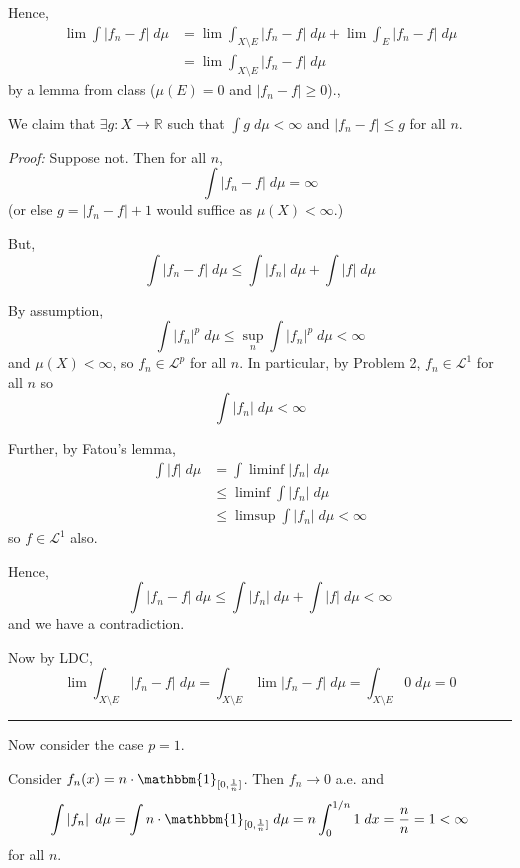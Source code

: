 \documentclass[12pt]{article}
\newcommand{\R}{\mathbb{R}}
\newcommand{\ind}{\mathbbm{1}}
\newcommand{\abs}[1]{\left\vert #1 \right\vert}
\renewcommand{\L}{\mathcal{L}}
\renewcommand{\div}{\vspace*{10pt}\hrule\vspace*{10pt}}
\newenvironment*{proof}[1][blue]{
\begin{tcolorbox}[
    parbox=false,
    colback=#1!5!white,
    colframe=#1!75!black,
    breakable
]}
{\end{tcolorbox}}
\begin{document}
\begin{itemize}
        Hence, 
        \begin{align*}
            \lim \int \abs{f_n - f} \; d\mu &= \lim \int_{X \setminus E} \abs{f_n - f} \; d\mu + \lim \int_E \abs{f_n - f} \; d\mu\\ 
            &= \lim \int_{X \setminus E} \abs{f_n - f} \; d\mu
        \end{align*}
        by a lemma from class ($\mu(E) = 0$ and $\abs{f_n - f} \geq 0$).,

        We claim that $\exists g: X \to \R$ such that $\int g \; d\mu < \infty$ and $\abs{f_n - f} \leq g$ for all $n$.

        \begin{proof}
            \emph{Proof:} Suppose not. Then for all $n$, 
            \[\int \abs{f_n - f} \; d\mu = \infty\]
            (or else $g = \abs{f_n - f} + 1$ would suffice as $\mu(X) < \infty$.)

            But, 
            \[\int \abs{f_n - f} \; d\mu \leq \int \abs{f_n} \; d\mu + \int \abs{f} \; d\mu\]

            By assumption, 
            \[\int \abs{f_n}^p \; d\mu \leq \sup_n \int \abs{f_n}^p \; d\mu < \infty\]
            and $\mu(X) < \infty$, so $f_n \in \L^p$ for all $n$. In particular, by Problem 2, $f_n \in \L^1$ for all $n$ so 
            \[\int \abs{f_n} \; d\mu < \infty\]

            Further, by Fatou's lemma, 
            \begin{align*}
                \int \abs{f} \; d\mu &= \int \liminf \abs{f_n} \; d\mu\\ 
                    &\leq \liminf \int \abs{f_n} \; d\mu\\ 
                    &\leq \limsup \int \abs{f_n} \; d\mu < \infty 
            \end{align*}
            so $f \in \L^1$ also. 

            Hence, 
            \[\int \abs{f_n - f} \; d\mu \leq \int \abs{f_n} \; d\mu + \int \abs{f} \; d\mu < \infty\]
            and we have a contradiction.             
        \end{proof}

        Now by LDC, 
        \[\lim \int_{X \setminus E} \abs{f_n - f} \; d\mu = \int_{X \setminus E} \lim \abs{f_n - f} \; d\mu = \int_{X \setminus E} 0 \; d\mu = 0\]

        \div 

        Now consider the case $p = 1$. 

        Consider $f_n(x) = n \cdot \ind_{[0, \frac{1}{n}]}$. Then $f_n \to 0$ a.e. and 
        \begin{align*}
            \int \abs{f_n} \; d\mu
                = \int n \cdot \ind_{[0, \frac{1}{n}]}\; d\mu 
                = n \int_0^{1/n} 1 \; dx
                = \frac{n}{n}
                = 1 < \infty
        \end{align*}
        for all $n$.      
        

\end{itemize}
\end{document}
